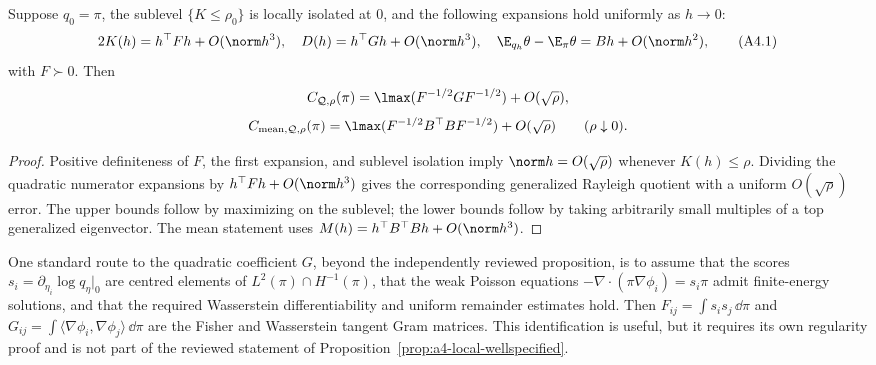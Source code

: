 \documentclass[../../main.tex]{subfiles}
\begin{document}
\begin{proposition}
\label{prop:a4-local-wellspecified}
Suppose $q_0=\pi$, the sublevel $\{K\le\rho_0\}$ is locally isolated at $0$, and the following
expansions hold uniformly as $h\to0$:
\[
 2K(h)=h^\top Fh+O(\norm h^3),\quad
 D(h)=h^\top Gh+O(\norm h^3),\quad
 \E_{q_h}\theta-\E_\pi\theta=Bh+O(\norm h^2),                 \tag{A4.1}
\]
with $F\succ0$. Then
\[
 C_{\mathcal Q,\rho}(\pi)
 =\lmax(F^{-1/2}GF^{-1/2})+O(\sqrt\rho),
\]
\[
 C_{\mathrm{mean},\mathcal Q,\rho}(\pi)
 =\lmax(F^{-1/2}B^\top BF^{-1/2})+O(\sqrt\rho)
 \qquad(\rho\downarrow0).
\]
\end{proposition}

\begin{proof}
Positive definiteness of $F$, the first expansion, and sublevel isolation imply
$\norm h=O(\sqrt\rho)$ whenever $K(h)\le\rho$. Dividing the quadratic numerator expansions by
$h^\top Fh+O(\norm h^3)$ gives the corresponding generalized Rayleigh quotient with a uniform
$O(\sqrt\rho)$ error. The upper bounds follow by maximizing on the sublevel; the lower bounds
follow by taking arbitrarily small multiples of a top generalized eigenvector. The mean statement
uses $M(h)=h^\top B^\top Bh+O(\norm h^3)$.
\end{proof}

\begin{remark}
\label{rem:a4-poisson-tangent}
One standard route to the quadratic coefficient $G$, beyond the independently reviewed
proposition, is to assume that the scores
$s_i=\partial_{\eta_i}\log q_\eta|_0$ are centred elements of
$L^2(\pi)\cap H^{-1}(\pi)$, that the weak Poisson equations
$-\nabla\!\cdot(\pi\nabla\phi_i)=s_i\pi$ admit finite-energy solutions, and that the required
Wasserstein differentiability and uniform remainder estimates hold. Then
$F_{ij}=\int s_is_j\,\dd\pi$ and
$G_{ij}=\int\langle\nabla\phi_i,\nabla\phi_j\rangle\,\dd\pi$ are the Fisher and Wasserstein
tangent Gram matrices. This identification is useful, but it requires its own regularity proof and
is not part of the reviewed statement of Proposition~\ref{prop:a4-local-wellspecified}.
\end{remark}
\end{document}
